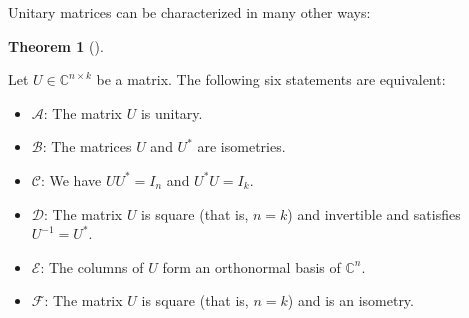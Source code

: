 \documentclass[numbers=enddot,12pt,final,onecolumn,notitlepage]{scrartcl}%
\numberwithin{exer}{subsection}
\theoremstyle{definition}
\newtheorem{theo}{Theorem}[subsection]
\newenvironment{theorem}[1][]
{\begin{theo}[#1]\begin{leftbar}}
{\end{leftbar}\end{theo}}
\begin{document}
Unitary matrices can be characterized in many other ways:

\begin{theorem}
\label{thm.unitary.unitary.eqs}Let $U\in\mathbb{C}^{n\times k}$ be a matrix.
The following six statements are equivalent:

\begin{itemize}
\item $\mathcal{A}$: The matrix $U$ is unitary.

\item $\mathcal{B}$: The matrices $U$ and $U^{\ast}$ are isometries.

\item $\mathcal{C}$: We have $UU^{\ast}=I_{n}$ and $U^{\ast}U=I_{k}$.

\item $\mathcal{D}$: The matrix $U$ is square (that is, $n=k$) and invertible
and satisfies $U^{-1}=U^{\ast}$.

\item $\mathcal{E}$: The columns of $U$ form an orthonormal basis of
$\mathbb{C}^{n}$.

\item $\mathcal{F}$: The matrix $U$ is square (that is, $n=k$) and is an isometry.
\end{itemize}
\end{theorem}
\end{document}
